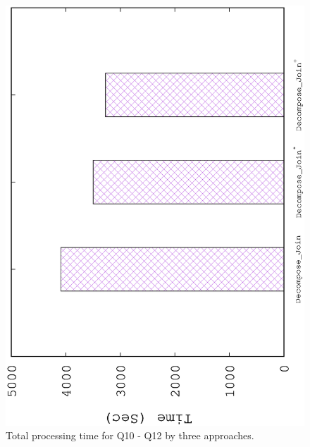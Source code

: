 \begin{figure}[H]
	\centering
	\includegraphics[scale=0.47, angle=270]{plot/threetotal.eps}
	\caption{Total processing time for Q10 - Q12 by three approaches.}
	\label{fig:threetotal}
\end{figure}

